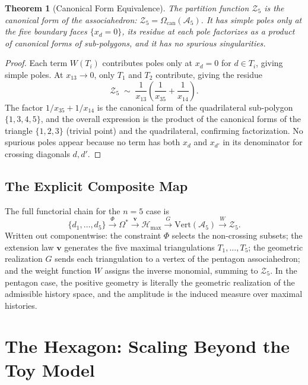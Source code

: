 \documentclass[12pt, oneside]{amsart}
\theoremstyle{plain}
\newtheorem{theorem}{Theorem}[section]
\theoremstyle{definition}
\theoremstyle{remark}
\newcommand{\Phif}{\Phi}
\newcommand{\OmKS}{\Omega}
\newcommand{\Hmax}{\mathcal{H}_{\max}}
\begin{document}
\begin{theorem}[Canonical Form Equivalence]
The partition function $\mathcal{Z}_5$ is the canonical form of the associahedron: $\mathcal{Z}_5 = \Omega_{\mathrm{can}}(\mathcal{A}_5)$. It has simple poles only at the five boundary faces $\{x_d = 0\}$, its residue at each pole factorizes as a product of canonical forms of sub-polygons, and it has no spurious singularities.
\end{theorem}

\begin{proof}
Each term $W(T_i)$ contributes poles only at $x_d = 0$ for $d \in T_i$, giving simple poles. At $x_{13} \to 0$, only $T_1$ and $T_2$ contribute, giving the residue
\[
  \mathcal{Z}_5 \;\sim\; \frac{1}{x_{13}} \left(\frac{1}{x_{35}} + \frac{1}{x_{14}}\right).
\]
The factor $1/x_{35} + 1/x_{14}$ is the canonical form of the quadrilateral sub-polygon $\{1,3,4,5\}$, and the overall expression is the product of the canonical forms of the triangle $\{1,2,3\}$ (trivial point) and the quadrilateral, confirming factorization. No spurious poles appear because no term has both $x_d$ and $x_{d'}$ in its denominator for crossing diagonals $d, d'$.
\end{proof}

\subsection{The Explicit Composite Map}

The full functorial chain for the $n=5$ case is
\begin{equation}
\label{eq:composite-map}
  \{d_1,\ldots,d_5\} \xrightarrow{\Phif} \OmKS^* \xrightarrow{\mathbf{v}} \Hmax \xrightarrow{G} \mathrm{Vert}(\mathcal{A}_5) \xrightarrow{W} \mathcal{Z}_5.
\end{equation}
Written out componentwise: the constraint $\Phif$ selects the non-crossing subsets; the extension law $\mathbf{v}$ generates the five maximal triangulations $T_1, \ldots, T_5$; the geometric realization $G$ sends each triangulation to a vertex of the pentagon associahedron; and the weight function $W$ assigns the inverse monomial, summing to $\mathcal{Z}_5$. In the pentagon case, the positive geometry is literally the geometric realization of the admissible history space, and the amplitude is the induced measure over maximal histories.

\section{The Hexagon: Scaling Beyond the Toy Model}
\label{sec:hexagon}
\end{document}
